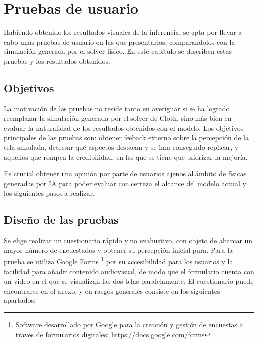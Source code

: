 \section{Pruebas de usuario}
\label{sec:PruebaTesters}

Habiendo obtenido los resultados visuales de la inferencia, se opta por llevar a cabo unas pruebas de usuario en las que presentarlos, comparandolos con la simulación generada por el solver físico. En este capítulo se describen estas pruebas y los resultados obtenidos.

\subsection{Objetivos}
La motivación de las pruebas no reside tanto en averiguar si se ha logrado reemplazar la simulación generada por el solver de Cloth, sino más bien en evaluar la naturalidad de los resultados obtenidos con el modelo. Los objetivos principales de las pruebas son: obtener feeback externo sobre la percepción de la tela simulada, detectar qué aspectos destacan y se han conseguido replicar, y aquellos que rompen la credibilidad, en los que se tiene que priorizar la mejoría. 

Es crucial obtener una opinión por parte de usuarios ajenos al ámbito de físicas generadas por IA para poder evaluar con certeza el alcance del modelo actual y los siguientes pasos a realizar.

\subsection{Diseño de las pruebas}
Se elige realizar un cuestionario rápido y no exahustivo, con objeto de abarcar un mayor número de encuestados y obtener su percepción inicial pura. Para la prueba se utiliza Google Forms \footnote{ Software desarrollado por Google para la creación y gestión de encuestas a través de formularios digitales: \url{https://docs.google.com/forms}} por su accesibilidad para los usuarios y la facilidad para añadir contenido audiovisual, de modo que el formulario cuenta con un video en el que se visualizan las dos telas paralelamente. El cuestionario puede encontrarse en el anexo, y en rasgos generales consiste en los siguientes apartados:

